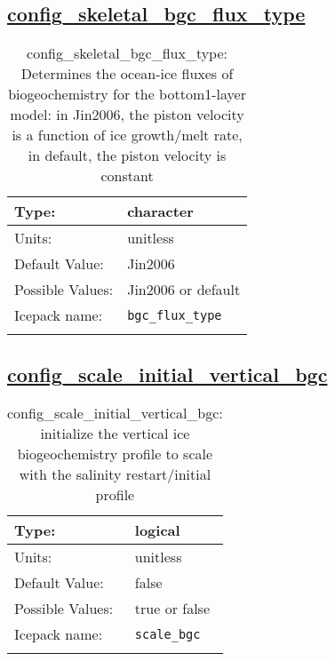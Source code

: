 \subsection[config\_skeletal\_bgc\_flux\_type]{\hyperref[sec:nm_tab_biogeochemistry]{config\_skeletal\_bgc\_flux\_type}}
\label{subsec:nm_sec_config_skeletal_bgc_flux_type}
\begin{center}
\begin{longtable}{| p{2.0in} || p{4.0in} |}
    \hline
    Type: & character \\
    \hline
    Units: & \si{unitless} \\
    \hline
    Default Value: & Jin2006 \\
    \hline
    Possible Values: & Jin2006 or default \\
    \hline
    \hline
    Icepack name: & \verb+bgc_flux_type+ \\
    \caption{config\_skeletal\_bgc\_flux\_type: Determines the ocean-ice fluxes of biogeochemistry for the bottom1-layer model: in Jin2006, the piston velocity is a function of ice growth/melt rate, in default, the piston velocity is constant}
\end{longtable}
\end{center}
\subsection[config\_scale\_initial\_vertical\_bgc]{\hyperref[sec:nm_tab_biogeochemistry]{config\_scale\_initial\_vertical\_bgc}}
\label{subsec:nm_sec_config_scale_initial_vertical_bgc}
\begin{center}
\begin{longtable}{| p{2.0in} || p{4.0in} |}
    \hline
    Type: & logical \\
    \hline
    Units: & \si{unitless} \\
    \hline
    Default Value: & false \\
    \hline
    Possible Values: & true or false \\
    \hline
    \hline
    Icepack name: & \verb+scale_bgc+ \\
    \caption{config\_scale\_initial\_vertical\_bgc: initialize the vertical ice biogeochemistry profile to scale with the salinity restart/initial profile}
\end{longtable}
\end{center}
